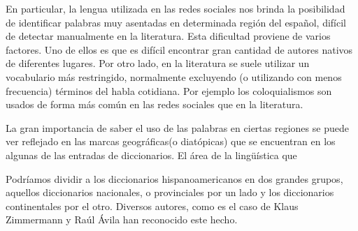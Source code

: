 
En particular, la lengua utilizada en las redes sociales nos brinda la posibilidad de identificar palabras muy asentadas en determinada región del español, difícil de detectar manualmente en la literatura. Esta dificultad proviene de varios factores. Uno de ellos es que es difícil encontrar gran cantidad de autores nativos de diferentes lugares. Por otro lado, en la literatura se suele utilizar un vocabulario más restringido, normalmente excluyendo (o utilizando con menos frecuencia) términos del habla cotidiana. Por ejemplo los coloquialismos son usados de forma más común en las redes sociales que en la literatura. 

La gran importancia de saber el uso de las palabras en ciertas regiones se puede ver reflejado en las marcas geográficas(o diatópicas) que se encuentran en los algunas de las entradas de diccionarios. El área de la lingüística que

Podríamos dividir a los diccionarios hispanoamericanos en dos grandes grupos, aquellos diccionarios nacionales, o provinciales por un lado y los diccionarios continentales por el otro. Diversos autores, como es el caso de Klaus Zimmermann y Raúl Ávila han reconocido este hecho. 

